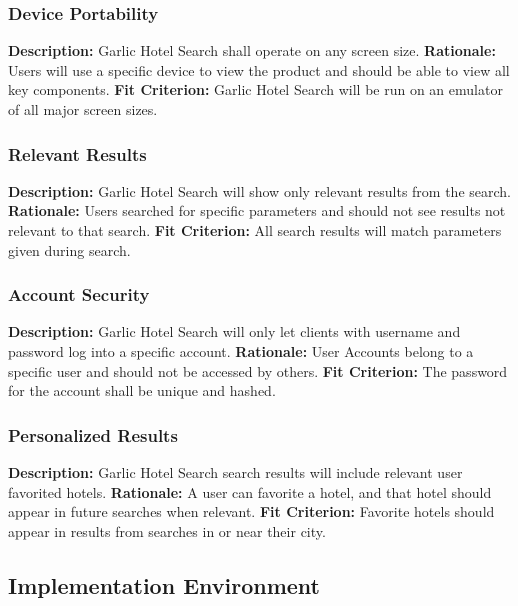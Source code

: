 \documentclass[]{article}
\begin{document}
\subsubsection{Device Portability}
\textbf{Description:} Garlic Hotel Search shall operate on any screen size.\newline
\textbf{Rationale:} Users will use a specific device to view the product and should be able to view all key components.\newline
\textbf{Fit Criterion:} Garlic Hotel Search will be run on an emulator of all major screen sizes.

\subsubsection{Relevant Results}
\textbf{Description:} Garlic Hotel Search will show only relevant results from the search.\newline
\textbf{Rationale:} Users searched for specific parameters and should not see results not relevant to that search.\newline
\textbf{Fit Criterion:} All search results will match parameters given during search.

\subsubsection{Account Security}
\textbf{Description:} Garlic Hotel Search will only let clients with username and password log into a specific account.\newline
\textbf{Rationale:} User Accounts belong to a specific user and should not be accessed by others.\newline
\textbf{Fit Criterion:} The password for the account shall be unique and hashed.

\subsubsection{Personalized Results}
\textbf{Description:} Garlic Hotel Search search results will include relevant user favorited hotels.\newline
\textbf{Rationale:} A user can favorite a hotel, and that hotel should appear in future searches when relevant.\newline
\textbf{Fit Criterion:} Favorite hotels should appear in results from searches in or near their city.

\subsection{Implementation Environment}
\end{document}
